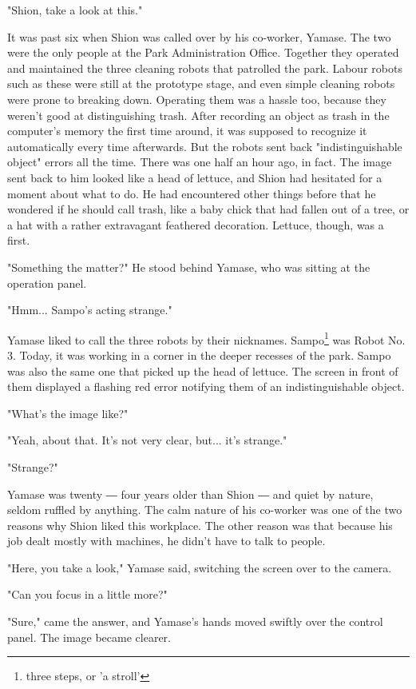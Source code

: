 \myspace

"Shion, take a look at this."

It was past six when Shion was called over by his co-worker, Yamase. The
two were the only people at the Park Administration Office. Together
they operated and maintained the three cleaning robots that patrolled
the park. Labour robots such as these were still at the prototype stage,
and even simple cleaning robots were prone to breaking down. Operating
them was a hassle too, because they weren't good at distinguishing
trash. After recording an object as trash in the computer's memory the
first time around, it was supposed to recognize it automatically every
time afterwards. But the robots sent back "indistinguishable object"
errors all the time. There was one half an hour ago, in fact. The image
sent back to him looked like a head of lettuce, and Shion had hesitated
for a moment about what to do. He had encountered other things before
that he wondered if he should call trash, like a baby chick that had
fallen out of a tree, or a hat with a rather extravagant feathered
decoration. Lettuce, though, was a first.

"Something the matter?" He stood behind Yamase, who was sitting at the
operation panel.

"Hmm... Sampo's acting strange."

Yamase liked to call the three robots by their nicknames. Sampo\footnote{three steps, or 'a stroll'} was
Robot No. 3. Today, it was working in a corner in the deeper recesses of
the park. Sampo was also the same one that picked up the head of
lettuce. The screen in front of them displayed a flashing red error
notifying them of an indistinguishable object.

"What's the image like?"

"Yeah, about that. It's not very clear, but... it's strange."

"Strange?"

Yamase was twenty ― four years older than Shion ― and quiet by nature,
seldom ruffled by anything. The calm nature of his co-worker was one of
the two reasons why Shion liked this workplace. The other reason was
that because his job dealt mostly with machines, he didn't have to talk
to people.

"Here, you take a look," Yamase said, switching the screen over to the
camera.

"Can you focus in a little more?"

"Sure," came the answer, and Yamase's hands moved swiftly over the
control panel. The image became clearer.

